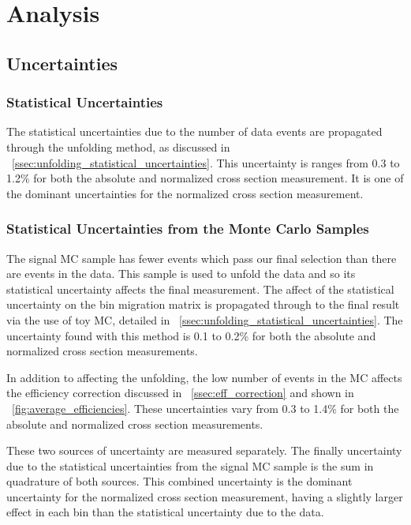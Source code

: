 \chapter{Analysis}
\label{chapter:analysis}

\section{Uncertainties}
\label{sec:uncertainties}

\subsection{Statistical Uncertainties}
\label{ssec:stat_uncertainty}

The statistical uncertainties due to the number of data events are propagated
through the unfolding method, as discussed in
\SEC~\ref{ssec:unfolding_statistical_uncertainties}. This uncertainty is
ranges from 0.3 to 1.2\% for both the absolute and normalized cross section
measurement. It is one of the dominant uncertainties for the normalized cross
section measurement.

\subsection{Statistical Uncertainties from the Monte Carlo Samples}
\label{ssec:mc_stat_uncertainty}

The \MADGRAPH signal MC sample has fewer events which pass our final selection
than there are events in the data. This sample is used to unfold the data and
so its statistical uncertainty affects the final measurement. The affect of the
statistical uncertainty on the bin migration matrix is propagated through to
the final result via the use of toy MC, detailed in
\SEC~\ref{ssec:unfolding_statistical_uncertainties}. The uncertainty found with
this method is 0.1 to 0.2\% for both the absolute and normalized cross section
measurements.

In addition to affecting the unfolding, the low number of events in the MC
affects the efficiency correction discussed in \SEC~\ref{ssec:eff_correction}
and shown in \FIG~\ref{fig:average_efficiencies}. These uncertainties vary from
0.3 to 1.4\% for both the absolute and normalized cross section measurements.

These two sources of uncertainty are measured separately. The finally
uncertainty due to the statistical uncertainties from the \MADGRAPH signal MC
sample is the sum in quadrature of both sources. This combined uncertainty is
the dominant uncertainty for the normalized cross section measurement, having a
slightly larger effect in each \phistar bin than the statistical uncertainty
due to the data.

